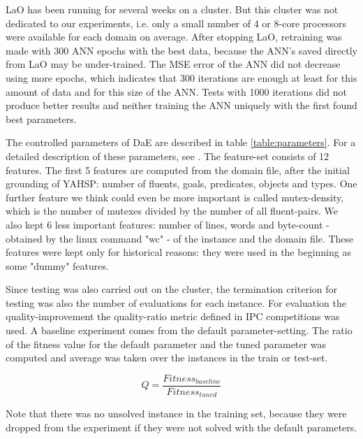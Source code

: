 \documentclass{MYsig-alternate}
\begin{document}
LaO has been running for several weeks on a cluster. But this cluster was not dedicated to our experiments, i.e. only a small number of 4 or 8-core processors were available for each domain on average. After stopping LaO, retraining was made with 300 ANN epochs with the best data, because the ANN's saved directly from LaO may be under-trained. The MSE error of the ANN did not decrease using more epochs, which indicates that 300 iterations are enough at least for this amount of data and for this size of the ANN. Tests with 1000 iterations did not produce better results and neither training the ANN uniquely with the first found best parameters.

The controlled parameters of DaE are described in table \ref{table:parameters}. For a detailed description of these parameters, see \cite{BibGECCO:2010}. The feature-set consists of 12 features. The first 5 features are computed from the domain file, after the initial grounding of YAHSP: number of fluents, goals, predicates, objects and types. One further feature we think could even be more important is called mutex-density, which is the number of mutexes divided by the number of all fluent-pairs. We also kept 6 less important features: number of lines, words and byte-count - obtained by the linux command "wc" - of the instance and the domain file. These features were kept only for historical reasons: they were used in the beginning as some "dummy" features.

Since testing was also carried out on the cluster, the termination criterion for testing was also the number of evaluations for each instance. For evaluation the quality-improvement the quality-ratio metric defined in IPC competitions was used. A baseline experiment comes from the default parameter-setting. The ratio of the fitness value for the default parameter and the tuned parameter was computed and average was taken over the instances in the train or test-set. 

\begin{equation}Q=\frac{Fitness_{baseline}}{Fitness_{tuned}}\end{equation}

Note that there was no unsolved instance in the training set, because they were dropped from the experiment if they were not solved with the default parameters. 
\end{document}

